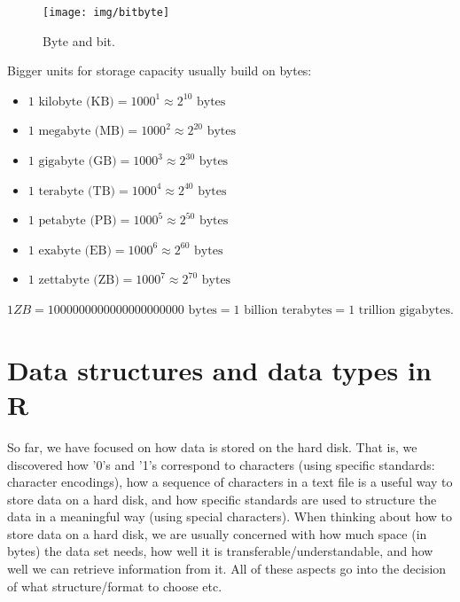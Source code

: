 \documentclass[
  12pt,
]{style/krantz}
\providecommand{\tightlist}{%
  \setlength{\itemsep}{0pt}\setlength{\parskip}{0pt}}
\begin{document}
\begin{figure}

{\centering \texttt{[image: img/bitbyte]} 

}

\caption{Byte and bit.}\label{fig:bitbyteword}
\end{figure}



Bigger units for storage capacity usually build on bytes:

\begin{itemize}
\tightlist
\item
  \(1 \text{ kilobyte (KB)} = 1000^{1} \approx 2^{10} \text{ bytes}\)
\item
  \(1 \text{ megabyte (MB)} = 1000^{2} \approx 2^{20} \text{ bytes}\)
\item
  \(1 \text{ gigabyte (GB)} = 1000^{3} \approx 2^{30} \text{ bytes}\)
\item
  \(1 \text{ terabyte (TB)} = 1000^{4} \approx 2^{40} \text{ bytes}\)
\item
  \(1 \text{ petabyte (PB)} = 1000^{5} \approx 2^{50} \text{ bytes}\)
\item
  \(1 \text{ exabyte (EB)} = 1000^{6} \approx 2^{60} \text{ bytes}\)
\item
  \(1 \text{ zettabyte (ZB)} = 1000^{7} \approx 2^{70} \text{ bytes}\)
\end{itemize}

\(1 ZB = 1000000000000000000000\text{ bytes} = 1 \text{ billion terabytes} = 1 \text{ trillion gigabytes}.\)

\hypertarget{data-structures-and-data-types-in-r}{%
\section{Data structures and data types in R}\label{data-structures-and-data-types-in-r}}

So far, we have focused on how data is stored on the hard disk. That is, we discovered how '0's and '1's correspond to characters (using specific standards: character encodings), how a sequence of characters in a text file is a useful way to store data on a hard disk, and how specific standards are used to structure the data in a meaningful way (using special characters). When thinking about how to store data on a hard disk, we are usually concerned with how much space (in bytes) the data set needs, how well it is transferable/understandable, and how well we can retrieve information from it. All of these aspects go into the decision of what structure/format to choose etc.
\end{document}
